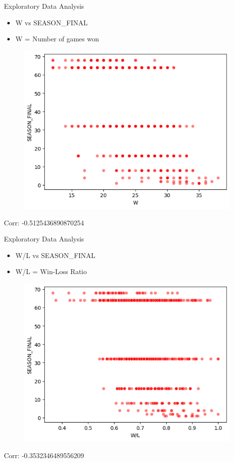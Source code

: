\documentclass{beamer}
\begin{document}
\begin{frame}{Exploratory Data Analysis}
  \begin{center}
    \begin{itemize}
        \item W vs SEASON\_FINAL
        \item W = Number of games won
    \end{itemize}

    \begin{figure}
      \centering
      \includegraphics[width=0.5\linewidth]{wscatterplot.png} %
    \end{figure}

    \vspace{0.1cm}

    Corr: -0.5125436890870254
  \end{center}
\end{frame}

\begin{frame}{Exploratory Data Analysis}
  \begin{center}
    \begin{itemize}
        \item W/L vs SEASON\_FINAL
        \item W/L = Win-Loss Ratio
    \end{itemize}

    \begin{figure}
      \centering
      \includegraphics[width=0.5\linewidth]{wlscatterplot.png} %
    \end{figure}

    \vspace{0.1cm}

    Corr: -0.3532346489556209

  \end{center}
\end{frame}
\end{document}

